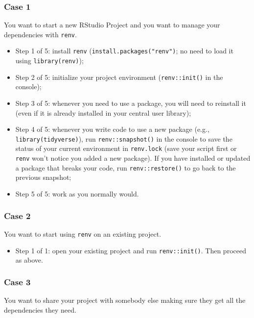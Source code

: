 \documentclass[
]{book}
\providecommand{\tightlist}{%
  \setlength{\itemsep}{0pt}\setlength{\parskip}{0pt}}
\begin{document}
\hypertarget{case-1}{%
\subsubsection{Case 1}\label{case-1}}

You want to start a new RStudio Project and you want to manage your dependencies
with \texttt{renv}.

\begin{itemize}
\tightlist
\item
  Step 1 of 5: install \texttt{renv} (\texttt{install.packages("renv")}; no need to load it
  using \texttt{library(renv)});
\item
  Step 2 of 5: initialize your project environment (\texttt{renv::init()} in the console);
\item
  Step 3 of 5: whenever you need to use a package, you will need to reinstall it
  (even if it is already installed in your central user library);
\item
  Step 4 of 5: whenever you write code to use a new package (e.g., \texttt{library(tidyverse)}), run \texttt{renv::snapshot()} in the console to save the status
  of your current environment in \texttt{renv.lock} (save your script first or \texttt{renv}
  won't notice you added a new package). If you have installed or updated a
  package that breaks your code, run \texttt{renv::restore()} to go back to the previous
  snapshot;
\item
  Step 5 of 5: work as you normally would.
\end{itemize}

\hypertarget{case-2}{%
\subsubsection{Case 2}\label{case-2}}

You want to start using \texttt{renv} on an existing project.

\begin{itemize}
\tightlist
\item
  Step 1 of 1: open your existing project and run \texttt{renv::init()}. Then proceed
  as above.
\end{itemize}

\hypertarget{case-3}{%
\subsubsection{Case 3}\label{case-3}}

You want to share your project with somebody else making sure they get all the
dependencies they need.
\end{document}
